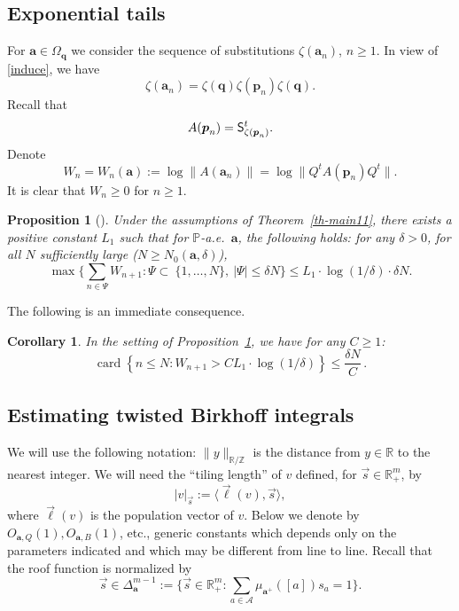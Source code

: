 \documentclass[JEP,XML,SOM,Unicode]{cedram}
\let\mathcal\mathscr
\newcommand{\sep}{:}
\theoremstyle{plain}
\newtheorem{corollary}[theorem]{Corollary}
\newtheorem{prop}[theorem]{Proposition}
\theoremstyle{definition}
\DeclareMathOperator{\card}{card}
\newcommand\bom{{\boldsymbol a}}\let\ba\bom
\newcommand\bp{{\boldsymbol p}}
\newcommand\bq{{\boldsymbol q}}
\let\Om\Omega
\newcommand\Ak{\mathcal{A}}
\newcommand{\R}{\mathbb{R}}
\newcommand{\Z}{\mathbb{Z}}
\renewcommand{\P}{\mathbb{P}}
\newcommand\Sf{{\sf S}}
\newcommand\be{\begin{equation}}
\newcommand\ee{\end{equation}}
\begin{document}
\subsection{Exponential tails}

For $\bom\in \Om_\bq$ we consider the sequence of substitutions $\zeta(\bom_n)$, $n\ge 1$. In view of \eqref{induce}, we have
\[
\zeta(\bom_n) = \zeta(\bq) \zeta(\bp_n)\zeta(\bq).
\]
Recall that
\[
A(\bp_n) = \Sf_{\zeta(\bp_n)}^t.
\]
Denote
\be \label{def-W}
W_n = W_n(\bom):=\log\|A(\bom_n)\| = \log\|Q^t A(\bp_n) Q^t\|.
\ee
It is clear that $W_n\ge 0$ for $n\ge 1$.

\begin{prop}[{\cite[Prop.\,6.1]{BuSo18a}}] \label{prop-proba}
Under the assumptions of Theorem~\ref{th-main11},
there exists a positive constant $L_1$ such that for $\P$-a.e.\ $\bom$, the following holds: for any $\delta>0$, for all $N$ sufficiently large ($N\ge N_0(\bom,\delta)$),
\be \label{w-cond2}\textstyle
\max\bigl\{\sum_{n\in \Psi} W_{n+1}\sep \Psi\subset \ \{1,\ldots,N\},\ |\Psi| \le \delta N\bigr\} \le L_1\cdot \log(1/\delta)
\cdot \delta N.
\ee
\end{prop}

The following is an immediate consequence.

\begin{corollary} \label{cor-immed}
In the setting of Proposition~\ref{prop-proba}, we have for any $C\ge 1$:
\be \label{eq-immed}
\card\left\{n\le N\sep W_{n+1} > C L_1\cdot \log(1/\delta)\right\} \le \frac{\delta N}{C}\,.
\ee
\end{corollary}

\subsection{Estimating twisted Birkhoff integrals}

We will use the following notation: $\|y\|_{\R/\Z}$ is the distance from $y\in \R$ to the nearest integer.
We will need the
``tiling length'' of $v$ defined, for $\vec s\in \R^m_+$, by
\be \label{tilength}
|v|_{\vec{s}}:= \langle\vec{\ell}(v), \vec{s}\rangle,
\ee
where $\vec{\ell}(v)$ is the population vector of $v$.
Below we denote by $O_{\bom,Q}(1), O_{\bom,B}(1)$, etc., generic constants which depends only on the parameters indicated and which may be different from line to line. Recall that the roof function is normalized by
\[\textstyle
\vec{s}\in \Delta_{\bom}^{m-1}:= \bigl\{\vec{s}\in \R^m_+\sep \sum_{a\in \Ak} \mu_{\bom^+}([a]) s_a =1\bigr\}.
\]
\end{document}
